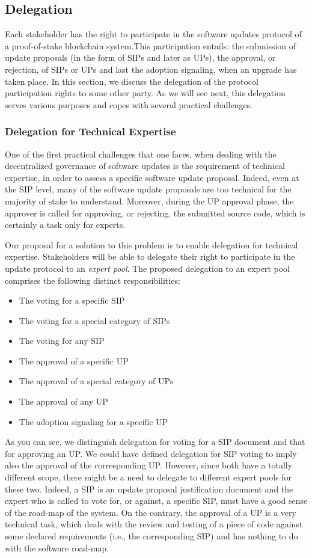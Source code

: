 \subsection{Delegation}
Each stakeholder has the right to participate in the software updates protocol of a proof-of-stake blockchain system.This participation entails: the submission of update proposals (in the form of SIPs and later as UPs), the approval, or rejection, of SIPs or UPs and last the adoption signaling, when an upgrade has taken place. In this section, we discuss the delegation of the protocol participation rights to some other party. As we will see next, this delegation serves various purposes and copes with several practical challenges.
\subsubsection{Delegation for Technical Expertise}
One of the first practical challenges that one faces, when dealing with the decentralized governance of software updates is the requirement of technical expertise, in order to assess a specific software update proposal. Indeed, even at the SIP level, many of the software update proposals are too technical for the majority of stake to understand. Moreover, during the UP approval phase, the approver is called for approving, or rejecting, the submitted source code, which is certainly a task only for experts.

Our proposal for a solution to this problem is to enable delegation for technical expertise. Stakeholders will be able to delegate their right to participate in the update protocol to an \emph{expert pool}. The proposed delegation to an expert pool comprises the following distinct responsibilities:
\begin{itemize}
\item The voting for a specific SIP
\item The voting for a special category of SIPs 
\item The voting for any SIP
\item The approval of a specific UP
\item The approval of a special category of UPs
\item The approval of any UP
\item The adoption signaling for a specific UP
\end{itemize}
As you can see, we distinguish delegation for voting for a SIP document and that for approving an UP. We could have defined delegation for SIP voting to imply also the approval of the corresponding UP. However, since both have a totally different scope, there might be a need to delegate to different expert pools for these two. Indeed, a SIP is an update proposal justification document and the expert who is called to vote for, or against, a specific SIP, must have a good sense of the road-map of the system. On the contrary, the approval of a UP is a very technical task, which deals with the review and testing of a piece of code against some declared requirements (i.e., the corresponding SIP) and has nothing to do with the software road-map.


